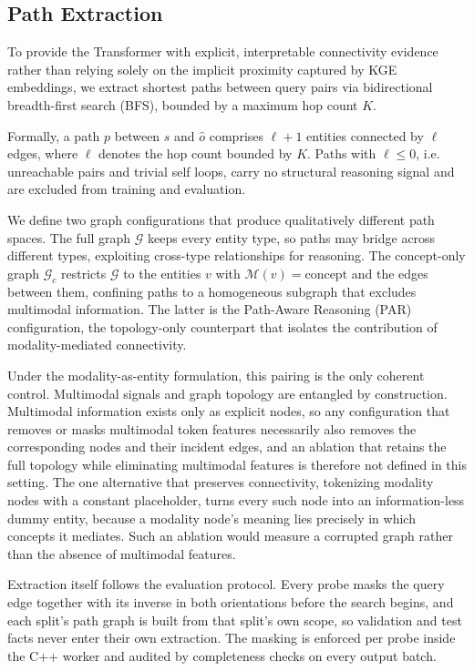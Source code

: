 \documentclass[runningheads]{llncs}
\begin{document}
\subsection{Path Extraction}
\label{sec:path-extraction}

To provide the Transformer with explicit, interpretable connectivity evidence rather than
relying solely on the implicit proximity captured by KGE embeddings, we extract shortest
paths between query pairs via bidirectional breadth-first search (BFS), bounded by a
maximum hop count $K$.

Formally, a path $p$ between $s$ and $\hat{o}$ comprises $\ell + 1$
entities connected by $\ell$ edges, where
$\ell$ denotes the hop count bounded by $K$.
Paths with $\ell \leq 0$, i.e. unreachable pairs and trivial self loops,
carry no structural reasoning signal and are excluded from training and
evaluation.

We define two graph configurations that produce qualitatively different
path spaces. The full graph $\mathcal{G}$ keeps every entity type, so
paths may bridge across different types, exploiting cross-type
relationships for reasoning. The concept-only graph $\mathcal{G}_c$
restricts $\mathcal{G}$ to the entities $v$ with
$\mathcal{M}(v) = \text{concept}$ and the edges between them, confining
paths to a homogeneous subgraph that excludes multimodal information.
The latter is the Path-Aware Reasoning (PAR) configuration, the
topology-only counterpart that isolates the contribution of
modality-mediated connectivity.

Under the modality-as-entity formulation, this pairing is the only
coherent control. Multimodal signals and graph topology are entangled by
construction. Multimodal information exists only as explicit nodes, so
any configuration that removes or masks multimodal token features
necessarily also removes the corresponding nodes and their incident
edges, and an ablation that retains the full topology while eliminating
multimodal features is therefore not defined in this setting. The one
alternative that preserves connectivity, tokenizing modality nodes with
a constant placeholder, turns every such node into an information-less
dummy entity, because a modality node's meaning lies precisely in which
concepts it mediates. Such an ablation would measure a corrupted graph
rather than the absence of multimodal features.

Extraction itself follows the evaluation protocol. Every probe masks
the query edge together with its inverse in both orientations before
the search begins, and each split's path graph is built from that
split's own scope, so validation and test facts never enter their own
extraction. The masking is enforced per probe inside the C++ worker
and audited by completeness checks on every output batch.
\end{document}
